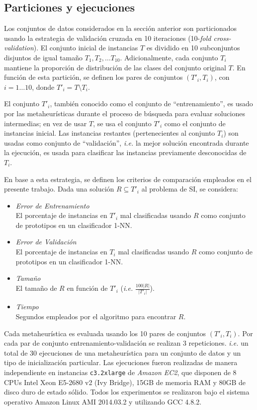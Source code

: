 \subsection{Particiones y ejecuciones}

Los conjuntos de datos considerados en la sección anterior son particionados usando la estrategia de validación cruzada en 10 iteraciones (10-\emph{fold cross-validation}). El conjunto inicial de instancias $T$ es dividido en 10 subconjuntos disjuntos de igual tamaño $T_1, T_2, \dots T_{10}$. Adicionalmente, cada conjunto $T_i$ mantiene la proporción de distribución de las clases del conjunto original $T$. En función de esta partición, se definen los pares de conjuntos $(T'_i, T_i)$, con $i = 1 \dots 10$, donde $T'_i = T \setminus T_i$.

El conjunto $T'_i$, también conocido como el conjunto de ``entrenamiento'', es usado por las metaheurísticas durante el proceso de búsqueda para evaluar soluciones intermedias; en vez de usar $T$, se usa el conjunto $T'_i$ como el conjunto de instancias inicial. Las instancias restantes (pertenecientes al conjunto $T_i$) son usadas como conjunto de ``validación'', \emph{i.e.} la mejor solución encontrada durante la ejecución, es usada para clasificar las instancias previamente desconocidas de $T_i$.

En base a esta estrategia, se definen los criterios de comparación empleados en el presente trabajo. Dada una solución $R \subseteq T'_i$ al problema de SI, se considera:

\begin{itemize}
\item \emph{Error de Entrenamiento}\\
El porcentaje de instancias en $T'_i$ mal clasificadas usando $R$ como conjunto de prototipos en un clasificador 1-NN.
\item \emph{Error de Validación}\\
El porcentaje de instancias en $T_i$ mal clasificadas usando $R$ como conjunto de prototipos en un clasificador 1-NN.
\item \emph{Tamaño}\\
El tamaño de $R$ en función de $T'_i$ (\emph{i.e.} $\frac{100 \vert R \vert}{\vert T'_i \vert}$).
\item \emph{Tiempo}\\
Segundos empleados por el algoritmo para encontrar $R$.
\end{itemize} 

Cada metaheurística es evaluada usando los 10 pares de conjuntos $(T'_i, T_i)$. Por cada par de conjunto entrenamiento-validación se realizan 3 repeticiones. \emph{i.e.} un total de 30 ejecuciones de una metaheurística para un conjunto de datos y un tipo de inicialización particular. Las ejecuciones fueron realizadas de manera independiente en instancias \texttt{c3.2xlarge} de \emph{Amazon EC2}, que disponen de 8 CPUs Intel Xeon E5-2680 v2 (Ivy Bridge), 15GB de memoria RAM y 80GB de disco duro de estado sólido. Todos los experimentos se realizaron bajo el sistema operativo Amazon Linux AMI 2014.03.2 y utilizando GCC 4.8.2.

